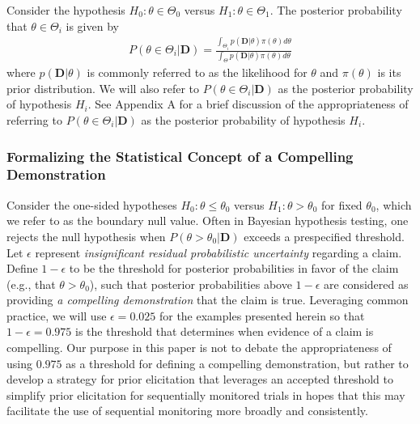 \documentclass[12pt]{article}
\begin{document}
Consider the hypothesis $H_0:\theta\in\Theta_{0}$ versus $H_1:\theta\in\Theta_{1}$. The posterior probability that $\theta\in\Theta_i$ is given by
\begin{align}\label{eq:postprob}
P(\theta\in\Theta_i|\mathbf{D})
=\frac{\int_{\Theta_i} p(\mathbf{D}|\theta)\pi (\theta)d\theta}{\int_{\Theta}p(\mathbf{D}|\theta)\pi(\theta) d\theta}
\end{align}
where $p(\mathbf{D}|\theta)$ is commonly referred to as the likelihood for $\theta$ and $\pi(\theta)$ is its prior distribution. 
%
%
%
We will also refer to $P(\theta\in\Theta_i|\mathbf{D})$ as the posterior probability of hypothesis $H_i$.
%
See Appendix A for a brief discussion of the appropriateness of referring to $P(\theta\in\Theta_i|\mathbf{D})$
as the posterior probability of hypothesis $H_i$.


\subsubsection{Formalizing the Statistical Concept of a Compelling Demonstration}\label{sec:sub_evid}
Consider the one-sided hypotheses $H_0: \theta \le \theta_0$ versus $H_1: \theta > \theta_0$ for fixed $\theta_0$, which we refer to as the boundary null value.
Often in Bayesian hypothesis testing, one rejects the null hypothesis when $P(\theta > \theta_0 |\mathbf{D})$ exceeds 
a prespecified threshold.
%
Let $\epsilon$ represent \textit{insignificant residual probabilistic uncertainty} regarding a claim. 
 Define $1-\epsilon$ to be the threshold for posterior probabilities in favor of the claim 
(e.g., that $\theta > \theta_0$), such that posterior probabilities above $1-\epsilon$ are considered as providing \textit{a compelling demonstration} 
that the claim is true. 
%
Leveraging common practice, we will use $\epsilon=0.025$ for the examples presented herein 
so that $1-\epsilon=0.975$ is the threshold that determines when evidence of a claim is compelling.
%
Our purpose in this paper is not to debate the appropriateness of using $0.975$ as a threshold for defining a compelling demonstration, but rather to develop a strategy for prior elicitation that leverages an accepted threshold to simplify prior elicitation for sequentially monitored trials in hopes that this may facilitate the use of sequential monitoring more broadly and consistently.
\end{document}
